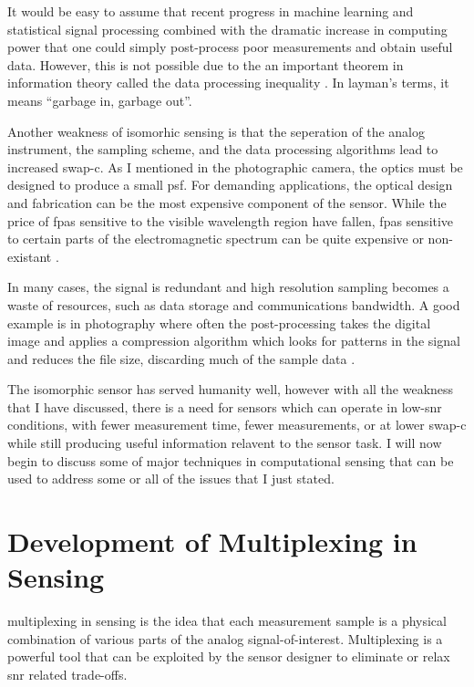 It would be easy to assume that recent progress in machine learning and statistical signal processing combined with the dramatic increase in computing power that one could simply post-process poor measurements and obtain useful data. However, this is not possible due to the an important theorem in information theory called the \gls{data processing inequality} \cite{cover2012elements}. In layman's terms, it means ``garbage in, garbage out''.

Another weakness of isomorhic sensing is that the seperation of the analog instrument, the sampling scheme, and the data processing algorithms lead to increased \gls{swap-c}. As I mentioned in the photographic camera, the optics must be designed to produce a small \gls{psf}. For demanding applications, the optical design and fabrication can be the most expensive component of the sensor. While the price of \gls{fpa}s sensitive to the visible wavelength region have fallen, \glspl{fpa} sensitive to certain parts of the electromagnetic spectrum can be quite expensive or non-existant \cite{watts2014terahertz, noor2011compressive}.

In many cases, the signal is redundant and high resolution sampling becomes a waste of resources, such as data storage and communications bandwidth. A good example is in photography where often the post-processing takes the digital image and applies a compression algorithm which looks for patterns in the signal and reduces the file size, discarding much of the sample data \cite{taubman2012jpeg2000}. 

The isomorphic sensor has served humanity well, however with all the weakness that I have discussed, there is a need for sensors which can operate in low-\gls{snr} conditions, with fewer measurement time, fewer measurements, or at lower \gls{swap-c} while still producing useful information relavent to the sensor task. I will now begin to discuss some of major techniques in computational sensing that can be used to address some or all of the issues that I just stated. 

\section{Development of Multiplexing in Sensing}\label{sec:multiplexInSensing}

\Gls{multiplexing} in sensing is the idea that each measurement sample is a physical combination of various parts of the analog signal-of-interest.  Multiplexing is a powerful tool that can be exploited by the sensor designer to eliminate or relax \gls{snr} related trade-offs. 


